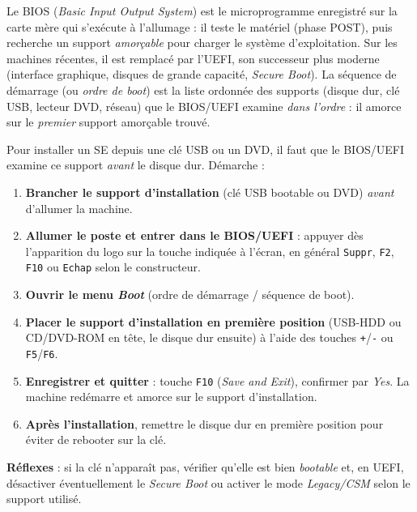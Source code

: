 \documentclass[11pt]{article}
\newcommand{\cle}[1]{{\popxbold\color{popdark}#1}}
\begin{document}
\begin{definition}
Le \cle{BIOS} (\emph{Basic Input Output System}) est le microprogramme enregistré sur la carte mère qui s'exécute à l'allumage : il teste le matériel (phase POST), puis recherche un support \emph{amorçable} pour charger le système d'exploitation. Sur les machines récentes, il est remplacé par l'\cle{UEFI}, son successeur plus moderne (interface graphique, disques de grande capacité, \emph{Secure Boot}). La \cle{séquence de démarrage} (ou \emph{ordre de boot}) est la liste ordonnée des supports (disque dur, clé USB, lecteur DVD, réseau) que le BIOS/UEFI examine \emph{dans l'ordre} : il amorce sur le \emph{premier} support amorçable trouvé.
\end{definition}

\begin{methode}
Pour installer un SE depuis une clé USB ou un DVD, il faut que le BIOS/UEFI examine ce support \emph{avant} le disque dur. Démarche :
\begin{enumerate}
\item \textbf{Brancher le support d'installation} (clé USB bootable ou DVD) \emph{avant} d'allumer la machine.
\item \textbf{Allumer le poste et entrer dans le BIOS/UEFI} : appuyer dès l'apparition du logo sur la touche indiquée à l'écran, en général \texttt{Suppr}, \texttt{F2}, \texttt{F10} ou \texttt{Echap} selon le constructeur.
\item \textbf{Ouvrir le menu \emph{Boot}} (ordre de démarrage / séquence de boot).
\item \textbf{Placer le support d'installation en première position} (USB-HDD ou CD/DVD-ROM en tête, le disque dur ensuite) à l'aide des touches \texttt{+}/\texttt{-} ou \texttt{F5}/\texttt{F6}.
\item \textbf{Enregistrer et quitter} : touche \texttt{F10} (\emph{Save and Exit}), confirmer par \emph{Yes}. La machine redémarre et amorce sur le support d'installation.
\item \textbf{Après l'installation}, remettre le disque dur en première position pour éviter de rebooter sur la clé.
\end{enumerate}
\textbf{Réflexes} : si la clé n'apparaît pas, vérifier qu'elle est bien \emph{bootable} et, en UEFI, désactiver éventuellement le \emph{Secure Boot} ou activer le mode \emph{Legacy/CSM} selon le support utilisé.
\end{methode}
\end{document}
